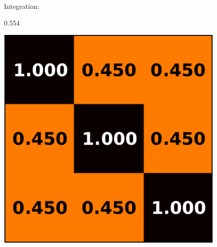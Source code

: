 \documentclass[5p]{elsarticle}
\begin{document}
\begin{figure}
\hspace*{2ex}%
\begin{minipage}{.19\linewidth}
    \center\sffamily
    {\small Integration:}

    0.554
\end{minipage}%
\begin{minipage}{.2\linewidth}
    \includegraphics[width=\linewidth]{correlation_ex1.pdf}
\end{minipage}%
\hfill%
\begin{minipage}{.033\linewidth}

\end{minipage}
\end{figure}
\end{document}
